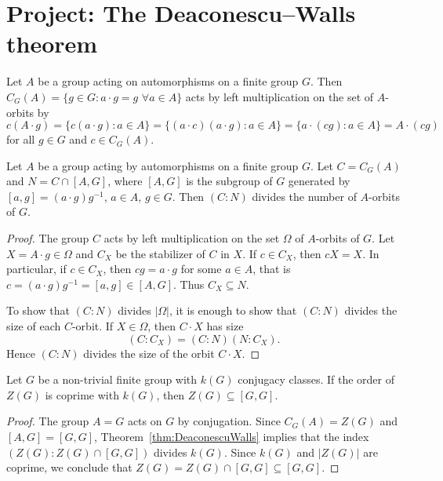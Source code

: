 \section{Project: The Deaconescu--Walls theorem}

Let $A$ be a group acting on automorphisms on a finite group $G$. Then 
$C_{G}(A)=\{g\in G:a\cdot g=g\,\,\forall a\in A\}$ acts by left multiplication 
on the set of 
$A$-orbits by 
\[
  c(A\cdot g)
  =\{c(a\cdot g):a\in A\}
  =\{(a\cdot c)(a\cdot g):a\in A\}
  =\{a\cdot (cg):a\in A\}
  =A\cdot (cg)
\]
for all $g\in G$ and $c\in C_G(A)$.


\begin{theorem}
	\label{thm:DeaconescuWalls}
	Let $A$ be a group acting by automorphisms on a finite group $G$. Let
	$C=C_{G}(A)$ and $N=C\cap [A,G]$,
	where $[A,G]$ is the subgroup of $G$ generated by $[a,g]=(a\cdot g)g^{-1}$,
	$a\in A$, $g\in G$.  Then $(C:N)$ divides the number of $A$-orbits of 
	$G$. 
\end{theorem}

\begin{proof}
  The group $C$ acts by left multiplication on the set $\Omega$ of 
  $A$-orbits of $G$. Let $X=A\cdot g\in\Omega$ and $C_X$ be the stabilizer of 
  $C$ in $X$. If $c\in C_X$, then $cX=X$. In particular, if $c\in C_X$, then 
  $cg=a\cdot g$ for some $a\in A$, that is $c=(a\cdot
  g)g^{-1}=[a,g]\in [A,G]$. Thus $C_X\subseteq N$.

  To show that $(C:N)$ divides $|\Omega|$, it is enough to show that 
  $(C:N)$ divides the size of each $C$-orbit. If $X\in\Omega$, then $C\cdot
  X$ has size 
  \[
	(C:C_X)=(C:N)(N:C_X).
  \]
  Hence $(C:N)$ divides the size of the orbit $C\cdot X$.
\end{proof}

\begin{corollary}
	\label{cor:Z(G)subset[G,G]}
  Let $G$ be a non-trivial finite group with $k(G)$ conjugacy classes. 
  If the order of $Z(G)$ is coprime with $k(G)$, then  
  $Z(G)\subseteq[G,G]$.
\end{corollary}

\begin{proof}
	The group $A=G$ acts on $G$ by conjugation. Since $C_G(A)=Z(G)$ and 
	$[A,G]=[G,G]$, Theorem~\ref{thm:DeaconescuWalls} implies that the index 
	$(Z(G):Z(G)\cap [G,G])$ divides $k(G)$. Since $k(G)$ and $|Z(G)|$ are coprime, we conclude that $Z(G)=Z(G)\cap [G,G]\subseteq [G,G]$. 
\end{proof}


